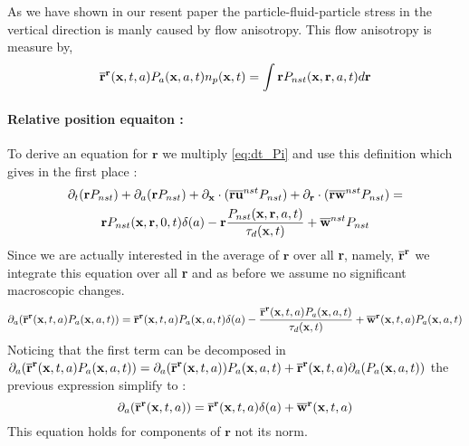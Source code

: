 As we have shown in our resent paper the particle-fluid-particle stress in the vertical direction is manly caused by flow anisotropy. 
This flow anisotropy is measure by, 
\begin{equation}
    \overline{\textbf{r}}^{\textbf{r}}(\textbf{x},t,a)P_a(\textbf{x},a,t)n_p(\textbf{x},t)
    = \int \textbf{r} P_{nst}(\textbf{x},\textbf{r},a,t) d\textbf{r}
\end{equation}
\paragraph{Relative position equaiton :}
To derive an equation for $\textbf{r}$ we multiply \ref{eq:dt_Pi} and use this definition which gives in the first place :
\begin{multline}
    \partial_t (\textbf{r} P_{nst})
    + \partial_a (\textbf{r} P_{nst})
    + \partial_{\textbf{x}} \cdot (\overline{\textbf{r}\textbf{u} }^{nst} P_{nst})
    + \partial_{\textbf{r}}  \cdot (\overline{\textbf{r}\textbf{w}}^{nst} P_{nst})
    =  \\
    \textbf{r} P_{nst}(\textbf{x},\textbf{r},0,t)\delta(a)
    - \textbf{r} \frac{P_{nst}(\textbf{x},\textbf{r},a,t)}{\tau_d(\textbf{x},t)}
    + \overline{\textbf{w}}^{nst}P_{nst}
    \label{eq:dt_r_nst}
\end{multline}
Since we are actually interested in the average of $\textbf{r}$ over all \textbf{r}, namely, $\overline{\textbf{r}}^{\textbf{r}}$ we integrate this equation over all \textbf{r} and as before we assume no significant macroscopic changes. 
\begin{multline*}
    \partial_a (\overline{\textbf{r}}^{\textbf{r}}(\textbf{x},t,a)P_a(\textbf{x},a,t))
    =  
    \overline{\textbf{r}}^{\textbf{r}}(\textbf{x},t,a)P_a(\textbf{x},a,t)\delta(a)
     - \frac{\overline{\textbf{r}}^{\textbf{r}}(\textbf{x},t,a)P_a(\textbf{x},a,t)}{\tau_d(\textbf{x},t)} 
    + \overline{\textbf{w}}^{\textbf{r}}(\textbf{x},t,a)P_a(\textbf{x},a,t)
\end{multline*}
Noticing that the first term can be decomposed in $\partial_a (\overline{\textbf{r}}^{\textbf{r}}(\textbf{x},t,a)P_a(\textbf{x},a,t)) = \partial_a (\overline{\textbf{r}}^{\textbf{r}}(\textbf{x},t,a))P_a(\textbf{x},a,t) + \overline{\textbf{r}}^{\textbf{r}}(\textbf{x},t,a) \partial_a (P_a(\textbf{x},a,t))$ the previous expression simplify to : 
\begin{equation*}
    \partial_a (\overline{\textbf{r}}^{\textbf{r}}(\textbf{x},t,a))
    =  
    \overline{\textbf{r}}^{\textbf{r}}(\textbf{x},t,a)\delta(a)
    + \overline{\textbf{w}}^{\textbf{r}}(\textbf{x},t,a)
    \label{eq:da_r}
\end{equation*}
This equation holds for components of $\textbf{r}$ not its norm. 

